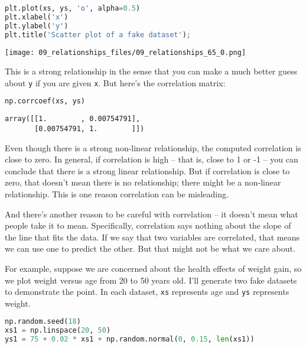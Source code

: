 \begin{lstlisting}[language=Python,style=source]
plt.plot(xs, ys, 'o', alpha=0.5)
plt.xlabel('x')
plt.ylabel('y')
plt.title('Scatter plot of a fake dataset');
\end{lstlisting}

\begin{center}
\texttt{[image: 09\_relationships\_files/09\_relationships\_65\_0.png]}
\end{center}

This is a strong relationship in the sense that you can make a much
better guess about \passthrough{\lstinline!y!} if you are given
\passthrough{\lstinline!x!}. But here's the correlation matrix:

\begin{lstlisting}[language=Python,style=source]
np.corrcoef(xs, ys)
\end{lstlisting}

\begin{lstlisting}[style=output]
array([[1.        , 0.00754791],
       [0.00754791, 1.        ]])
\end{lstlisting}

Even though there is a strong non-linear relationship, the computed
correlation is close to zero. In general, if correlation is high -- that
is, close to 1 or -1 -- you can conclude that there is a strong linear
relationship. But if correlation is close to zero, that doesn't mean
there is no relationship; there might be a non-linear relationship. This
is one reason correlation can be misleading.

And there's another reason to be careful with correlation -- it doesn't
mean what people take it to mean. Specifically, correlation says nothing
about the slope of the line that fits the data. If we say that two
variables are correlated, that means we can use one to predict the
other. But that might not be what we care about.

For example, suppose we are concerned about the health effects of weight
gain, so we plot weight versus age from 20 to 50 years old. I'll
generate two fake datasets to demonstrate the point. In each dataset,
\passthrough{\lstinline!xs!} represents age and
\passthrough{\lstinline!ys!} represents weight.

\begin{lstlisting}[language=Python,style=source]
np.random.seed(18)
xs1 = np.linspace(20, 50)
ys1 = 75 + 0.02 * xs1 + np.random.normal(0, 0.15, len(xs1))
\end{lstlisting}

